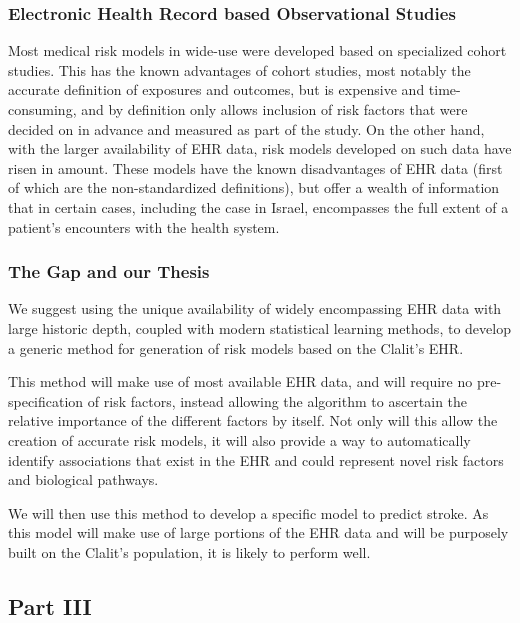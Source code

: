 \documentclass[a4paper,12pt]{article}
\begin{document}
			\subsubsection{Electronic Health Record based Observational Studies}
		
			Most medical risk models in wide-use were developed based on specialized cohort studies\cite{Goldstein2016}. This has the known advantages of cohort studies, most notably the accurate definition of exposures and outcomes, but is expensive and time-consuming, and by definition only allows inclusion of risk factors that were decided on in advance and measured as part of the study. On the other hand, with the larger availability of EHR data, risk models developed on such data have risen in amount. These models have the known disadvantages of EHR data (first of which are the non-standardized definitions), but offer a wealth of information that in certain cases, including the case in Israel\cite{Lovis2015}, encompasses the full extent of a patient's encounters with the health system\cite{Goldstein2017}.
			
			\subsubsection{The Gap and our Thesis}
			
			We suggest using the unique availability of widely encompassing EHR data with large historic depth, coupled with modern statistical learning methods, to develop a generic method for generation of risk models based on the Clalit's EHR.
			
			This method will make use of most available EHR data, and will require no pre-specification of risk factors, instead allowing the algorithm to ascertain the relative importance of the different factors by itself. Not only will this allow the creation of accurate risk models, it will also provide a way to automatically identify associations that exist in the EHR and could represent novel risk factors and biological pathways.
			
			We will then use this method to develop a specific model to predict stroke. As this model will make use of large portions of the EHR data and will be purposely built on the Clalit's population, it is likely to perform well.
		
		\subsection{Part III}
		
\end{document}
